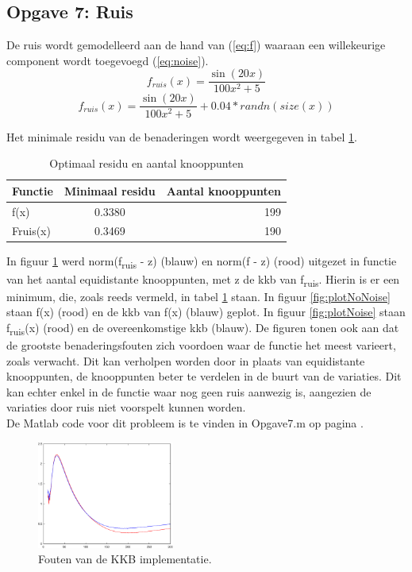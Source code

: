 \documentclass[a4paper]{article}
\newcommand{\opgave}[1]{\subsection{Opgave #1}}
\begin{document}
\opgave{7: Ruis}\label{sec:oef7}
De ruis wordt gemodelleerd aan de hand van (\ref{eq:f}) waaraan een willekeurige component wordt toegevoegd (\ref{eq:noise}).
\begin{equation}\label{eq:f}
	f_{ruis}(x) = \frac{\sin{(20x)}}{100x^2+5}
\end{equation}
\begin{equation}\label{eq:noise}
	f_{ruis}(x) = \frac{\sin{(20x)}}{100x^2+5} + 0.04*randn(size(x))
\end{equation}

Het minimale residu van de benaderingen wordt weergegeven in tabel \ref{tab:splineError}.
\begin{table}[H]
	\centering
	\begin{tabular}{l c r}
		Functie & Minimaal residu & Aantal knooppunten \\ \hline
		f(x) & 0.3380 & 199 \\
		Fruis(x) & 0.3469 & 190 \\
	\end{tabular}
	\caption{Optimaal residu en aantal knooppunten}
	\label{tab:splineError}
\end{table}

In figuur \ref{fig:errorkkb} werd norm(f\textsubscript{ruis} - z) (blauw) en norm(f - z) (rood) uitgezet in functie van het aantal equidistante knooppunten, met z de kkb van f\textsubscript{ruis}. Hierin is er een minimum, die, zoals reeds vermeld, in tabel \ref{tab:splineError} staan. In figuur \ref{fig:plotNoNoise} staan f(x) (rood) en de kkb van f(x) (blauw) geplot. In figuur \ref{fig:plotNoise} staan f\textsubscript{ruis}(x) (rood) en de overeenkomstige kkb (blauw). De figuren tonen ook aan dat de grootste benaderingsfouten zich voordoen waar de functie het meest varieert, zoals verwacht. Dit kan verholpen worden door in plaats van equidistante knooppunten, de knooppunten beter te verdelen in de buurt van de variaties. Dit kan echter enkel in de functie waar nog geen ruis aanwezig is, aangezien de variaties door ruis niet voorspelt kunnen worden. \\

De Matlab code voor dit probleem is te vinden in Opgave7.m op pagina \pageref{sec:code7}.

\begin{figure}[H]
	\begin{center} 
		\includegraphics[width=0.4\textwidth]{ErrorBSplines.eps}
	\end{center}
	\caption{Fouten van de KKB implementatie.}
	\label{fig:errorkkb}
\end{figure}
\end{document}
